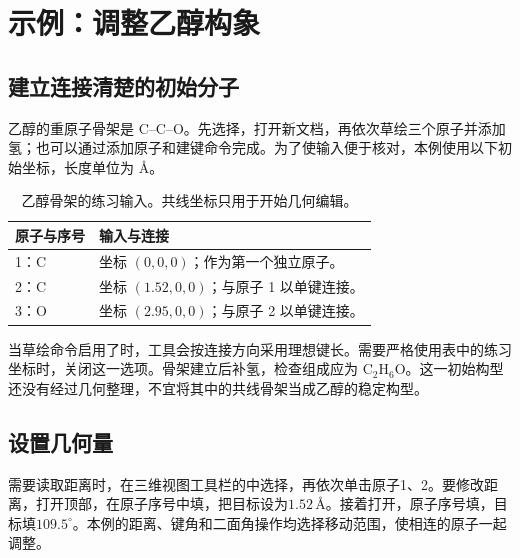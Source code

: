 


\section{示例：调整乙醇构象}

\subsection{建立连接清楚的初始分子}

乙醇的重原子骨架是 C--C--O。先选择，打开新文档，再依次草绘三个原子并添加氢；也可以通过添加原子和建键命令完成。为了使输入便于核对，本例使用以下初始坐标，长度单位为 \AA。

\begin{table}[htbp]
\centering
\caption{乙醇骨架的练习输入。共线坐标只用于开始几何编辑。}
\begin{tabularx}{\linewidth}{lX}
\toprule
原子与序号 & 输入与连接 \\
\midrule
1：C & 坐标 $(0,0,0)$；作为第一个独立原子。\\
2：C & 坐标 $(1.52,0,0)$；与原子 1 以单键连接。\\
3：O & 坐标 $(2.95,0,0)$；与原子 2 以单键连接。\\
\bottomrule
\end{tabularx}
\end{table}

当草绘命令启用了时，工具会按连接方向采用理想键长。需要严格使用表中的练习坐标时，关闭这一选项。骨架建立后补氢，检查组成应为 $\mathrm{C_2H_6O}$。这一初始构型还没有经过几何整理，不宜将其中的共线骨架当成乙醇的稳定构型。

\subsection{设置几何量}

需要读取距离时，在三维视图工具栏的中选择，再依次单击原子1、2。要修改距离，打开顶部，在原子序号中填，把目标设为$1.52\,\text{\AA}$。接着打开，原子序号填，目标填$109.5^\circ$。本例的距离、键角和二面角操作均选择移动范围，使相连的原子一起调整。

